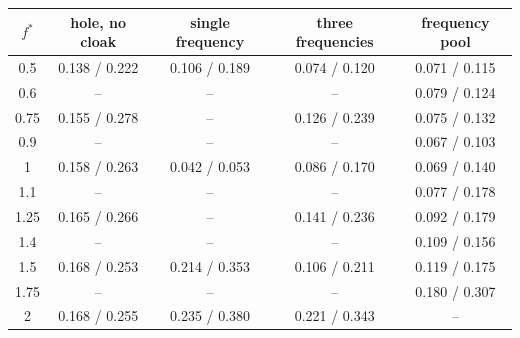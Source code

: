 \begin{tabular}{ccccc}
\toprule
$f^*$ & hole, no cloak & single frequency & three frequencies & frequency pool \\
\midrule
0.5 & 0.138 / 0.222 & 0.106 / 0.189 & 0.074 / 0.120 & 0.071 / 0.115 \\
0.6 & -- & -- & -- & 0.079 / 0.124 \\
0.75 & 0.155 / 0.278 & -- & 0.126 / 0.239 & 0.075 / 0.132 \\
0.9 & -- & -- & -- & 0.067 / 0.103 \\
1 & 0.158 / 0.263 & 0.042 / 0.053 & 0.086 / 0.170 & 0.069 / 0.140 \\
1.1 & -- & -- & -- & 0.077 / 0.178 \\
1.25 & 0.165 / 0.266 & -- & 0.141 / 0.236 & 0.092 / 0.179 \\
1.4 & -- & -- & -- & 0.109 / 0.156 \\
1.5 & 0.168 / 0.253 & 0.214 / 0.353 & 0.106 / 0.211 & 0.119 / 0.175 \\
1.75 & -- & -- & -- & 0.180 / 0.307 \\
2 & 0.168 / 0.255 & 0.235 / 0.380 & 0.221 / 0.343 & -- \\
\bottomrule
\end{tabular}
